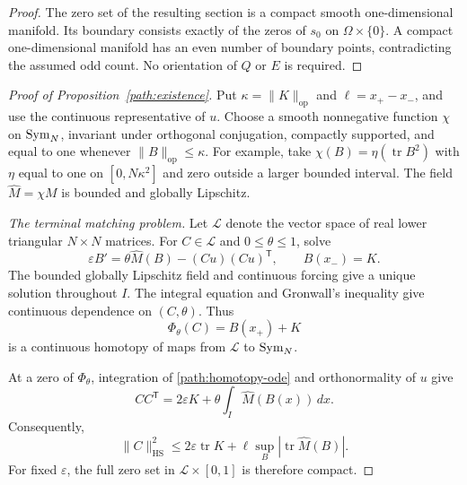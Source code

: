 \begin{proof}
The zero set of the resulting section is a compact smooth
one-dimensional manifold.  Its boundary consists exactly of the zeros
of $s_0$ on $\Omega\times\{0\}$.  A compact one-dimensional manifold
has an even number of boundary points, contradicting the assumed odd
count.  No orientation of $Q$ or $E$ is required.
\end{proof}



\begin{proof}[Proof of Proposition~\ref{path:existence}]
Put $\kappa=\|K\|_{\mathrm{op}}$ and $\ell=x_+-x_-$, and use the
continuous representative of $u$.  Choose a smooth nonnegative
function $\chi$ on $\operatorname{Sym}_N$, invariant under
orthogonal conjugation, compactly supported, and equal to one whenever
$\|B\|_{\mathrm{op}}\leq\kappa$.  For example, take
$\chi(B)=\eta(\operatorname{tr}B^2)$ with $\eta$ equal to one on
$[0,N\kappa^2]$ and zero outside a larger bounded interval.  The field
$\widehat M=\chi M$ is bounded and globally Lipschitz.

\smallskip
\noindent\emph{The terminal matching problem.}
Let $\mathcal L$ denote the vector space of real lower triangular
$N\times N$ matrices.  For $C\in\mathcal L$ and $0\leq\theta\leq1$,
solve
\begin{equation}\label{path:homotopy-ode}
 \varepsilon B'=\theta\widehat M(B)-(Cu)(Cu)^{\mathsf T},
 \qquad B(x_-)=K.
\end{equation}
The bounded globally Lipschitz field and continuous forcing give a
unique solution throughout $I$.  The integral equation and Gronwall's
inequality give continuous dependence on $(C,\theta)$.  Thus
\[
 \Phi_\theta(C)=B(x_+)+K
\]
is a continuous homotopy of maps from $\mathcal L$ to
$\operatorname{Sym}_N$.

At a zero of $\Phi_\theta$, integration of
\eqref{path:homotopy-ode} and orthonormality of $u$ give
\begin{equation}\label{path:coefficient-identity}
 CC^{\mathsf T}
 =2\varepsilon K+\theta\int_I\widehat M(B(x))\,dx.
\end{equation}
Consequently,
\begin{equation}\label{path:homotopy-bound}
 \|C\|_{\mathrm{HS}}^2
 \leq 2\varepsilon\operatorname{tr}K
       +\ell\sup_B|\operatorname{tr}\widehat M(B)|.
\end{equation}
For fixed $\varepsilon$, the full zero set in
$\mathcal L\times[0,1]$ is therefore compact.


\end{proof}
